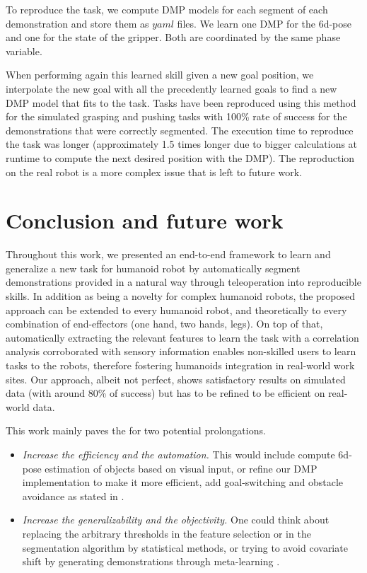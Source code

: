 \documentclass[conference]{IEEEtran}
\begin{document}
To reproduce the task, we compute DMP models for each segment of each demonstration and store them as $yaml$ files. We learn one DMP for the 6d-pose and one for the state of the gripper. Both are coordinated by the same phase variable.

When performing again this learned skill given a new goal position, we interpolate the new goal with all the precedently learned goals to find a new DMP model that fits to the task. Tasks have been reproduced using this method for the simulated grasping and pushing tasks with 100\% rate of success for the demonstrations that were correctly segmented. The execution time to reproduce the task was longer (approximately 1.5 times longer due to bigger calculations at runtime to compute the next desired position with the DMP). The reproduction on the real robot is a more complex issue that is left to future work. 


\section{Conclusion and future work}\label{conclusion}

Throughout this work, we presented an end-to-end framework to learn and generalize a new task for humanoid robot by automatically segment demonstrations provided in a natural way through teleoperation into reproducible skills. In addition as being a novelty for complex humanoid robots, the proposed approach can be extended to every humanoid robot, and theoretically to every combination of end-effectors (one hand, two hands, legs). On top of that, automatically extracting the relevant features to learn the task with a correlation analysis corroborated with sensory information enables non-skilled users to learn tasks to the robots, therefore fostering humanoids integration in real-world work sites. Our approach, albeit not perfect, shows satisfactory results on simulated data (with around 80\% of success) but has to be refined to be efficient on real-world data. \newline


This work mainly paves the for two potential prolongations.
\begin{itemize}
    \item \textit{Increase the efficiency and the automation.} This would include compute 6d-pose estimation of objects based on visual input, or refine our DMP implementation to make it more efficient, add goal-switching and obstacle avoidance as stated in \cite{saveriano_dynamic_2021}. 
    
    \item  \textit{Increase the generalizability and the objectivity.} One could think about replacing the arbitrary thresholds in the feature selection or in the segmentation algorithm by statistical methods, or trying to avoid covariate shift by generating demonstrations through meta-learning \cite{yu_one-shot_2018}.

\end{itemize}




\vspace{12pt}
\end{document}
